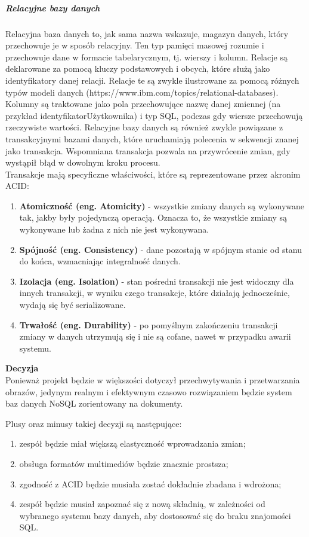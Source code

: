 \documentclass[12pt, a4paper, twoside, openany]{book}
\begin{document}
\subparagraph{Relacyjne bazy danych\\}
Relacyjna baza danych to, jak sama nazwa wskazuje, magazyn danych, który przechowuje je w sposób relacyjny.
Ten typ pamięci masowej rozumie i przechowuje dane w formacie tabelarycznym, tj. wierszy i kolumn.
Relacje są deklarowane za pomocą kluczy podstawowych i obcych, które służą jako identyfikatory danej relacji.
Relacje te są zwykle ilustrowane za pomocą różnych typów modeli danych (https://www.ibm.com/topics/relational-databases).
Kolumny są traktowane jako pola przechowujące nazwę danej zmiennej (na przykład identyfikatorUżytkownika) i typ SQL, podczas gdy wiersze przechowują rzeczywiste wartości.
Relacyjne bazy danych są również zwykle powiązane z transakcyjnymi bazami danych, które uruchamiają polecenia w sekwencji znanej jako transakcja.
Wspomniana transakcja pozwala na przywrócenie zmian, gdy wystąpił błąd w dowolnym kroku procesu.\\
Transakcje mają specyficzne właściwości, które są reprezentowane przez akronim ACID:
\begin{enumerate}[label=--]
    \item \textbf{Atomiczność (eng. Atomicity)} - wszystkie zmiany danych są wykonywane tak, jakby były pojedynczą operacją. Oznacza to, że wszystkie zmiany są wykonywane lub żadna z nich nie jest wykonywana.
    \item \textbf{Spójność (eng. Consistency)} - dane pozostają w spójnym stanie od stanu do końca, wzmacniając integralność danych.
    \item \textbf{Izolacja (eng. Isolation)} - stan pośredni transakcji nie jest widoczny dla innych transakcji, w wyniku czego transakcje, które działają jednocześnie, wydają się być serializowane.
    \item \textbf{Trwałość (eng. Durability)} - po pomyślnym zakończeniu transakcji zmiany w danych utrzymują się i nie są cofane, nawet w przypadku awarii systemu.
\end{enumerate}


\textbf{Decyzja}\\

Ponieważ projekt będzie w większości dotyczył przechwytywania i przetwarzania obrazów, jedynym realnym i efektywnym czasowo rozwiązaniem będzie system baz danych NoSQL zorientowany na dokumenty.

Plusy oraz minusy takiej decyzji są następujące:
\begin{enumerate}[label=--]
    \item zespół będzie miał większą elastyczność wprowadzania zmian;
    \item obsługa formatów multimediów będzie znacznie prostsza;
    \item zgodność z ACID będzie musiała zostać dokładnie zbadana i wdrożona;
    \item zespół będzie musiał zapoznać się z nową składnią, w zależności od wybranego systemu bazy danych, aby dostosować się do braku znajomości SQL.
\end{enumerate}
\end{document}
